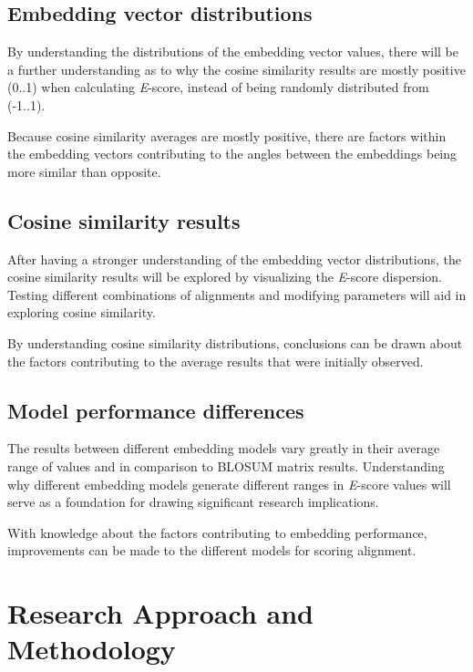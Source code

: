 \documentclass[
	letterpaper, %
	10pt, %
]{LTJournalArticle}
\begin{document}
\subsection{Embedding vector distributions}

By understanding the distributions of the embedding vector values, there will be a further understanding as to why the cosine similarity results are mostly positive (0..1) when calculating \textit{E}-score, instead of being randomly distributed from (-1..1).

Because cosine similarity averages are mostly positive, there are factors within the embedding vectors contributing to the angles between the embeddings being more similar than opposite.

\subsection{Cosine similarity results}

After having a stronger understanding of the embedding vector distributions, the cosine similarity results will be explored by visualizing the \textit{E}-score dispersion. Testing different combinations of alignments and modifying parameters will aid in exploring cosine similarity.

By understanding cosine similarity distributions, conclusions can be drawn about the factors contributing to the average results that were initially observed.

\subsection{Model performance differences}

The results between different embedding models vary greatly in their average range of values and in comparison to BLOSUM \autocite{Henikoff:1992} matrix results. Understanding why different embedding models generate different ranges in \textit{E}-score values will serve as a foundation for drawing significant research implications. 

With knowledge about the factors contributing to embedding performance, improvements can be made to the different models for scoring alignment.

\section{Research Approach and Methodology}
\end{document}
